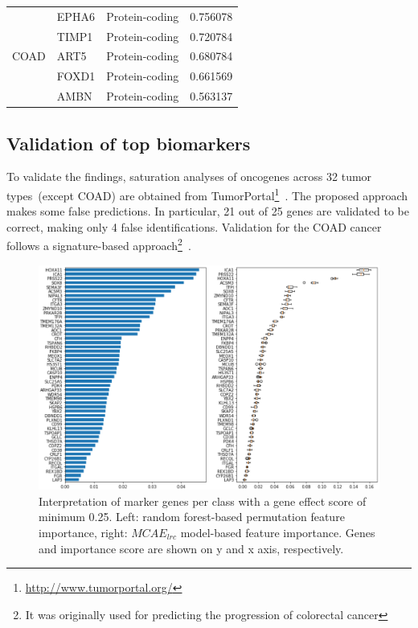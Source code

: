\begin{table}
\begin{center}
\begin{tabular}{l|l|l|l}
        \multirow{5}{*}{COAD}& EPHA6 & Protein-coding & 0.756078 \\ %
        & TIMP1 & Protein-coding & 0.720784 \\ %
        & ART5 & Protein-coding & 0.680784 \\ %
        & FOXD1 & Protein-coding & 0.661569 \\ %
        & AMBN & Protein-coding & 0.563137 \\ %
        \bottomrule
        \end{tabular}
        \vspace{-4mm}
    \end{center}
\end{table}

\subsection{Validation of top biomarkers}
To validate the findings, saturation analyses of oncogenes across 32 tumor types~(except COAD) are obtained from TumorPortal\footnote{ \url{http://www.tumorportal.org/}}~\cite{lawrence2014discovery}. The proposed approach makes some false predictions. In particular, 21 out of 25 genes are validated to be correct, making only 4 false identifications. Validation for the COAD cancer follows a signature-based approach\footnote{It was originally used for predicting the progression of colorectal cancer}~\cite{zuo2019identification}. 

\begin{figure}
\centering
	\includegraphics[scale=1.0]{images/rf_fi.png}
	\caption[Interpretation of marker genes]{Interpretation of marker genes per class with a gene effect score of minimum 0.25. Left: random forest-based permutation feature importance, right: $MCAE_{lrc}$ model-based feature importance. Genes and importance score are shown on y and x axis, respectively. }
    \label{fig:pfi}
\end{figure}

